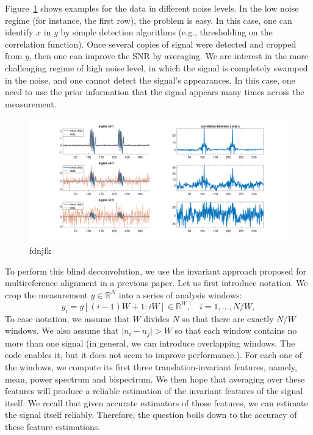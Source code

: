 \documentclass[12pt,a4paper]{article}
\numberwithin{equation}{section}
\numberwithin{figure}{section}
\theoremstyle{plain}
\theoremstyle{definition}
\theoremstyle{remark}
\theoremstyle{plain}
\theoremstyle{remark}
\theoremstyle{plain}
\theoremstyle{plain}
\newcommand{\RN}{\mathbb{R}^N}
\begin{document}
Figure~\ref{fig:example} shows examples for the data in different noise levels. In the low noise regime (for instance, the first row), the problem is easy. In this case, one can identify $x$ in $y$ by simple detection algorithms (e.g., thresholding on the correlation function). Once several copies of  signal were detected and cropped from $y$, then one can  improve the SNR by averaging. We are interest in the more challenging regime of high noise level, in which the signal is completely swamped in the noise, and one cannot detect the signal's appearances. In this case, one need to use the prior information that the signal appears many times across the measurement.

\begin{figure}
	\begin{center}
	\includegraphics[scale = .4]{example}
	\end{center}
\caption{fdnjfk}
\label{fig:example}
\end{figure}

To perform this blind deconvolution, we use the invariant approach proposed for multireference alignment in a previous paper. Let us  first introduce  notation. We crop the measurement $y\in\RN$ into a series of analysis windows: 
\begin{equation}
y_i = y[(i-1)W + 1 : iW ]\in\mathbb{R}^W, \quad i=1,\ldots,N/W, 
\end{equation}
To ease notation, we assume that  $W$ divides $N$  so that there are exactly $N/W$ windows. We also assume that $\vert n_i - n_j\vert >W$ so that each window contains no more than one signal (in general, we can introduce overlapping windows. The code enables it, but it does not seem to improve performance.).
For each one of the windows, we compute its first three translation-invariant features, namely, mean, power spectrum and bispectrum. We then hope that averaging over these features will produce a reliable estimation of the invariant features of the signal itself. 
We recall that given accurate estimators of those features, we can estimate the signal itself reliably. Therefore, the question boils down to the accuracy of these feature estimations.
\end{document}
